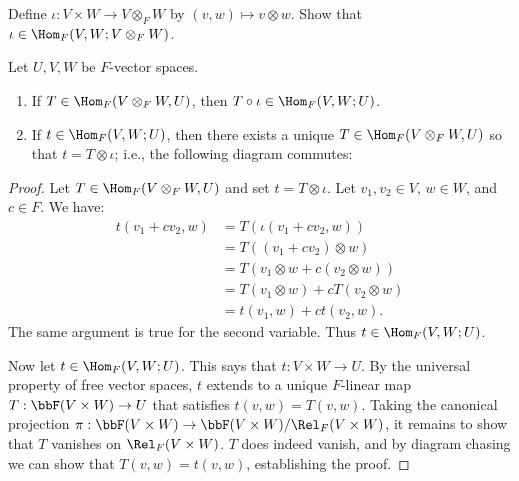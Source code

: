     \begin{exercise}
        Define $\iota:V \times W \rightarrow V \otimes_F W$ by $(v,w) \mapsto v \otimes w$. Show that $\iota \in \Hom_F(V,W;V \otimes_F W)$.
    \end{exercise}

    \begin{theorem}
        Let $U,V,W$ be $F$-vector spaces.
            \begin{enumerate}[label = (\arabic*)]
                \item If $T \in \Hom_F(V \otimes_F W, U)$, then $T \circ \iota \in \Hom_F(V,W;U)$. 
                \item If $t \in \Hom_F(V,W;U)$, then there exists a unique $T \in \Hom_F(V \otimes_F W,U)$ so that $t = T \otimes \iota$; i.e., the following diagram commutes:
                    \begin{center}
                    \end{center}
            \end{enumerate}
    \end{theorem}
        \begin{proof}
            Let $T \in \Hom_F(V \otimes_F W, U)$ and set $t = T \otimes \iota$. Let $v_1,v_2 \in V$, $w \in W$, and $c \in F$. We have:
                \begin{equation*}
                \begin{split}
                    t(v_1 +cv_2 , w) 
                    &= T(\iota(v_1 + cv_2,w)) \\
                    &= T((v_1 + cv_2) \otimes w) \\
                    & = T(v_1 \otimes w + c(v_2 \otimes w)) \\
                    & = T(v_1 \otimes w) + cT(v_2 \otimes w) \\
                    &= t(v_1,w) + ct(v_2,w).
                \end{split}
                \end{equation*}
            The same argument is true for the second variable. Thus $t \in \Hom_F(V,W;U)$.

            Now let $t\in \Hom_F(V,W;U)$. This says that $t:V \times W \rightarrow U$. By the universal property of free vector spaces, $t$ extends to a unique $F$-linear map $T: \bbF(V \times W) \rightarrow U$ that satisfies $t(v,w) = T(v,w)$. Taking the canonical projection $\pi:\bbF(V \times W) \rightarrow \bbF(V \times W)/\Rel_F(V \times W)$, it remains to show that $T$ vanishes on $\Rel_F(V \times W)$. $T$ does indeed vanish, and by diagram chasing we can show that $T(v,w) = t(v,w)$, establishing the proof.
        \end{proof}

